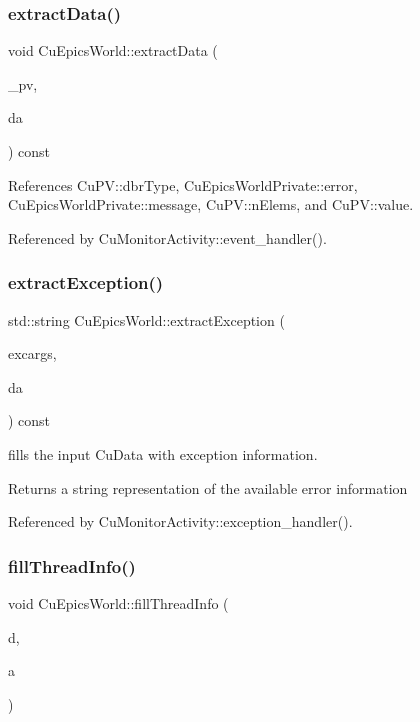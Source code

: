 \subsubsection{extract\+Data()}
{\footnotesize\ttfamily void Cu\+Epics\+World\+::extract\+Data (\begin{DoxyParamCaption}\item[{const \textbf{ Cu\+PV} $\ast$}]{\+\_\+pv,  }\item[{Cu\+Data \&}]{da }\end{DoxyParamCaption}) const}



References Cu\+P\+V\+::dbr\+Type, Cu\+Epics\+World\+Private\+::error, Cu\+Epics\+World\+Private\+::message, Cu\+P\+V\+::n\+Elems, and Cu\+P\+V\+::value.



Referenced by Cu\+Monitor\+Activity\+::event\+\_\+handler().

\mbox{\label{classCuEpicsWorld_aebd4c38ec2d510f69de4708fb0a7638c}} 
\subsubsection{extract\+Exception()}
{\footnotesize\ttfamily std\+::string Cu\+Epics\+World\+::extract\+Exception (\begin{DoxyParamCaption}\item[{struct exception\+\_\+handler\+\_\+args}]{excargs,  }\item[{Cu\+Data \&}]{da }\end{DoxyParamCaption}) const}



fills the input Cu\+Data with exception information. 

\begin{DoxyReturn}{Returns}
a string representation of the available error information 
\end{DoxyReturn}


Referenced by Cu\+Monitor\+Activity\+::exception\+\_\+handler().

\mbox{\label{classCuEpicsWorld_a6316206157828d6bbecd2a22c5e32b12}} 
\subsubsection{fill\+Thread\+Info()}
{\footnotesize\ttfamily void Cu\+Epics\+World\+::fill\+Thread\+Info (\begin{DoxyParamCaption}\item[{Cu\+Data \&}]{d,  }\item[{const Cu\+Activity $\ast$}]{a }\end{DoxyParamCaption})}



